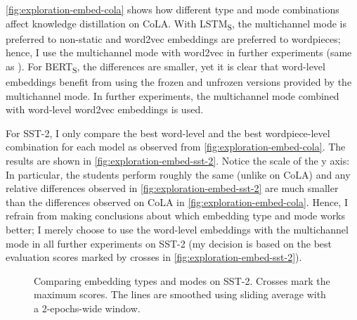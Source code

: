 \documentclass[bsc,frontabs,twoside,singlespacing,parskip,deptreport]{infthesis}
\def\BERTS{BERT\textsubscript{S}}
\def\LSTMS{LSTM\textsubscript{S}}
\def\sliding{The lines are smoothed using sliding average with a 2-epochs-wide window.}
\begin{document}
{{{      \autoref{fig:exploration-embed-cola} shows how different type and mode combinations affect knowledge distillation on CoLA. With \LSTMS, the multichannel mode is preferred to non-static and word2vec embeddings are preferred to wordpieces; hence, I use the multichannel mode with word2vec in further experiments (same as \citet{Tang_2019b}). For \BERTS, the differences are smaller, yet it is clear that word-level embeddings benefit from using the frozen and unfrozen versions provided by the multichannel mode. In further experiments, the multichannel mode combined with word-level word2vec embeddings is used.

      For SST-2, I only compare the best word-level and the best wordpiece-level combination for each model as observed from \autoref{fig:exploration-embed-cola}. The results are shown in \autoref{fig:exploration-embed-sst-2}. Notice the scale of the y axis: In particular, the students perform roughly the same (unlike on CoLA) and any relative differences observed in \autoref{fig:exploration-embed-sst-2} are much smaller than the differences observed on CoLA in \autoref{fig:exploration-embed-cola}. Hence, I refrain from making conclusions about which embedding type and mode works better; I merely choose to use the word-level embeddings with the multichannel mode in all further experiments on SST-2 (my decision is based on the best evaluation scores marked by crosses in \autoref{fig:exploration-embed-sst-2}).

      \begin{figure}[h!t]
        \centering
        \caption{Comparing embedding types and modes on SST-2. Crosses mark the maximum scores. \sliding}
        \label{fig:exploration-embed-sst-2}
      \end{figure}

}}}
\end{document}

